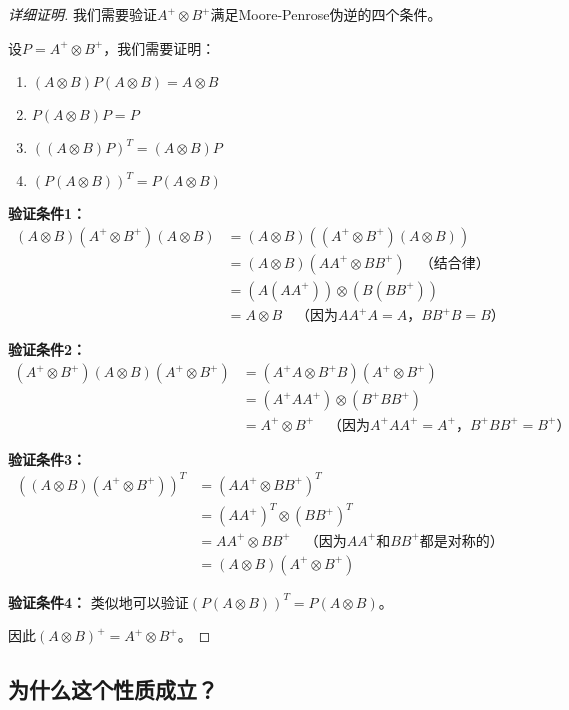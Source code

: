 \documentclass[11pt,a4paper]{ctexart}
\theoremstyle{definition}
\begin{document}
\begin{proof}[详细证明]
我们需要验证$A^+ \otimes B^+$满足Moore-Penrose伪逆的四个条件。

设$P = A^+ \otimes B^+$，我们需要证明：
\begin{enumerate}
\item $(A \otimes B) P (A \otimes B) = A \otimes B$
\item $P (A \otimes B) P = P$
\item $((A \otimes B) P)^T = (A \otimes B) P$
\item $(P (A \otimes B))^T = P (A \otimes B)$
\end{enumerate}

\textbf{验证条件1：}
\begin{align}
(A \otimes B)(A^+ \otimes B^+)(A \otimes B) &= (A \otimes B)((A^+ \otimes B^+)(A \otimes B)) \\
&= (A \otimes B)(AA^+ \otimes BB^+) \quad \text{（结合律）} \\
&= (A(AA^+)) \otimes (B(BB^+)) \\
&= A \otimes B \quad \text{（因为$AA^+A = A$，$BB^+B = B$）}
\end{align}

\textbf{验证条件2：}
\begin{align}
(A^+ \otimes B^+)(A \otimes B)(A^+ \otimes B^+) &= (A^+A \otimes B^+B)(A^+ \otimes B^+) \\
&= (A^+AA^+) \otimes (B^+BB^+) \\
&= A^+ \otimes B^+ \quad \text{（因为$A^+AA^+ = A^+$，$B^+BB^+ = B^+$）}
\end{align}

\textbf{验证条件3：}
\begin{align}
((A \otimes B)(A^+ \otimes B^+))^T &= (AA^+ \otimes BB^+)^T \\
&= (AA^+)^T \otimes (BB^+)^T \\
&= AA^+ \otimes BB^+ \quad \text{（因为$AA^+$和$BB^+$都是对称的）} \\
&= (A \otimes B)(A^+ \otimes B^+)
\end{align}

\textbf{验证条件4：}
类似地可以验证$(P(A \otimes B))^T = P(A \otimes B)$。

因此$(A \otimes B)^+ = A^+ \otimes B^+$。
\end{proof}

\subsection{为什么这个性质成立？}
\end{document}
